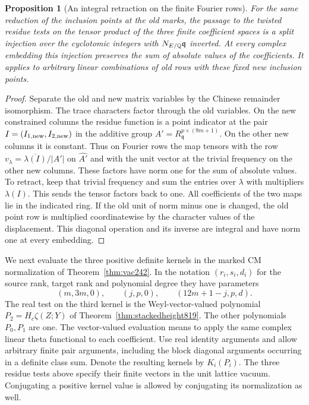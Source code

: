 \documentclass[a4paper,11pt]{article}
\newtheorem{proposition}{Proposition}[section]
\theoremstyle{definition}
\theoremstyle{remark}
\numberwithin{equation}{section}
\begin{document}
\begin{proposition}[An integral retraction on the finite Fourier rows]
\leavevmode\label{prop:markedretract820}
For the same reduction of the inclusion points at the old marks,
the passage to the twisted residue tests on the tensor product of
the three finite coefficient spaces is a split injection over the
cyclotomic integers with \(N_{E/\mathbb Q}\mathfrak q\) inverted. At every
complex embedding this injection preserves the sum of absolute
values of the coefficients. It applies to arbitrary linear
combinations of old rows with these fixed new inclusion points.
\end{proposition}
\begin{proof}
Separate the old and new matrix variables by the Chinese remainder
isomorphism. The trace characters factor through the old variables.
On the new constrained columns the residue function is a point
indicator at the pair \(I=(I_{1,\rm new},I_{2,\rm new})\) in the
additive group \(A'=R_{\mathfrak q}^{p\times(9m+1)}\).
On the other new columns it is constant. Thus on Fourier rows the
map tensors with the row \(v_\lambda=\overline{\lambda(I)}/|A'|\)
on \(\widehat {A'}\) and with the unit vector at the trivial
frequency on the other new columns. These factors have norm one
for the sum of absolute values. To retract, keep that trivial
frequency and sum the entries over \(\lambda\) with multipliers
\(\lambda(I)\). This sends the tensor factors back to one.
All coefficients of the two maps lie in the indicated ring.
If the old unit of norm minus one is changed, the old point
row is multiplied coordinatewise by the character values of
the displacement. This diagonal operation and its inverse are
integral and have norm one at every embedding.
\end{proof}

We next evaluate the three positive definite kernels in the
marked CM normalization of Theorem~\ref{thm:vac242}. In the
notation \((r_i,s_i,d_i)\) for the source rank, target rank
and polynomial degree they have parameters
\[
        (m,3m,0),\qquad(j,p,0),\qquad(12m+1-j,p,d).
\]
The real test on the third kernel is the Weyl-vector-valued
polynomial \(P_2=H_c\zeta(Z;Y)\) of
Theorem~\ref{thm:stackedheight819}. The other polynomials
\(P_0,P_1\) are one. The vector-valued evaluation means to
apply the same complex linear theta functional to each
coefficient. Use real identity arguments and allow arbitrary
finite pair arguments, including the block diagonal arguments
occurring in a definite class sum. Denote the resulting kernels
by \(K_i(P_i)\). The three residue tests above specify their
finite vectors in the unit lattice vacuum. Conjugating a positive
kernel value is allowed by conjugating its normalization as well.
\end{document}
